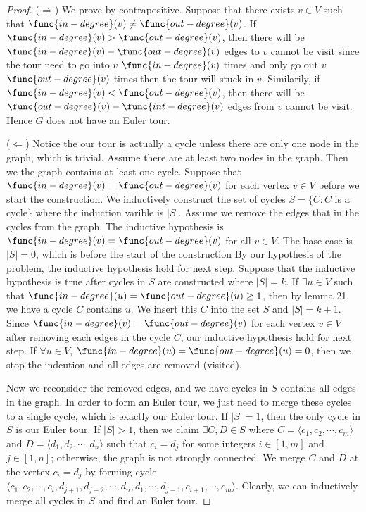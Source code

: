 \begin{proof}
    ($\Longrightarrow$)
    We prove by contrapositive.
    Suppose that there exists $v \in V$ such that
    $\func{in-degree}(v) \neq \func{out-degree}(v)$.
    If $\func{in-degree}(v) > \func{out-degree}(v)$,
    then there will be $\func{in-degree}(v) - \func{out-degree}(v)$
    edges to $v$ cannot be visit
    since the tour need to go into $v$ $\func{in-degree}(v)$ times
    and only go out $v$ $\func{out-degree}(v)$ times 
    then the tour will stuck in $v$.
    Similarily, if $\func{in-degree}(v) < \func{out-degree}(v)$,
    then there will be $\func{out-degree}(v) - \func{int-degree}(v)$
    edges from $v$ cannot be visit.
    Hence $G$ does not have an Euler tour.

    ($\Longleftarrow$)
    Notice the our tour is actually a cycle 
    unless there are only one node in the graph, which is trivial.
    Assume there are at least two nodes in the graph.
    Then we the graph contains at least one cycle.
    Suppose that $\func{in-degree}(v) = \func{out-degree}(v)$
    for each vertex $v \in V$ before we start the construction.
    We inductively construct the set of cycles 
    $S = \{ C : C$ is a cycle$ \}$
    where the induction varible is $|S|$.
    Assume we remove the edges that in the cycles from the graph.
    The inductive hypothesis is
    $\func{in-degree}(v) = \func{out-degree}(v)$
    for all $v \in V$.
    The base case is $|S| = 0$,
    which is before the start of the construction
    By our hypothesis of the problem,
    the inductive hypothesis hold for next step.
    Suppose that the inductive hypothesis is true
    after cycles in $S$ are constructed where $|S| = k$.
    If $\exists u \in V$ such that 
    $\func{in-degree}(u) = \func{out-degree}(u) \geq 1$,
    then by lemma 21, we have a cycle $C$ contains $u$.
    We insert this $C$ into the set $S$ and $|S| = k + 1$.
    Since $\func{in-degree}(v) = \func{out-degree}(v)$
    for each vertex $v \in V$
    after removing each edges in the cycle $C$,
    our inductive hypothesis hold for next step.
    If $\forall u \in V$,
    $\func{in-degree}(u) = \func{out-degree}(u) = 0$,
    then we stop the indcution and all edges are removed (visited).

    Now we reconsider the removed edges, 
    and we have cycles in $S$ contains all edges in the graph.
    In order to form an Euler tour, 
    we just need to merge these cycles to a single cycle,
    which is exactly our Euler tour.
    If $|S|=1$, then the only cycle in $S$ is our Euler tour.
    If $|S| > 1$, then we claim 
    $\exists C, D \in S$ where
    $C = \langle c_1, c_2, \cdots, c_m \rangle$ and
    $D = \langle d_1, d_2, \cdots, d_n \rangle$ 
    such that $c_i = d_j$ 
    for some integers $i \in [1,m]$ and $j \in [1,n]$;
    otherwise, the graph is not strongly connected.
    We merge $C$ and $D$ at the vertex $c_i = d_j$ by forming cycle 
    $\langle c_1, c_2, \cdots, c_i, 
    d_{j+1}, d_{j+2}, \cdots, d_n, d_1, \cdots, d_{j-1},
    c_{i+1}, \cdots, c_m \rangle$.
    Clearly, we can inductively merge all cycles in $S$
    and find an Euler tour.    
\end{proof}

